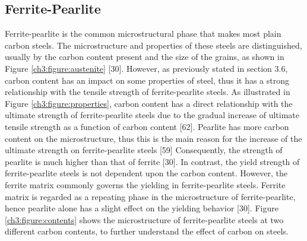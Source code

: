 \documentclass[12pt]{report}
\begin{document}
\subsection{Ferrite-Pearlite}
Ferrite-pearlite is the common microstructural phase that makes most plain carbon steels. The microstructure and properties of these steels are distinguished, usually by the carbon content present and the size of the grains, as shown in Figure \ref{ch3:figure:austenite} [30]. However, as previously stated in section 3.6, carbon content has an impact on some properties of steel, thus it has a strong relationship with the tensile strength of ferrite-pearlite steels. As illustrated in Figure \ref{ch3:figure:properties}, carbon content has a direct relationship with the ultimate strength of ferrite-pearlite steels due to the gradual increase of ultimate tensile strength as a function of carbon content [62]. 
Pearlite has more carbon content on the microstructure, thus this is the main reason for the increase of the ultimate strength on ferrite-pearlite steels [59] Consequently, the strength of pearlite is much higher than that of ferrite [30]. In contrast, the yield strength of ferrite-pearlite steels is not dependent upon the carbon content. However, the ferrite matrix commonly governs the yielding in ferrite-pearlite steels. Ferrite matrix is regarded as a repeating phase in the microstructure of ferrite-pearlite, hence pearlite alone has a slight effect on the yielding behavior [30]. Figure \ref{ch3:figure:contents} shows the microstructure of ferrite-pearlite steels at two different carbon contents, to further understand the effect of carbon on steels.
\end{document}
